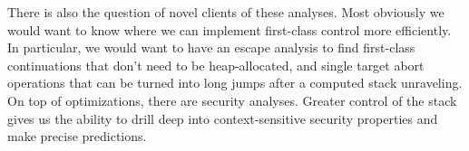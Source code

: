There is also the question of novel clients of these analyses.
%
Most obviously we would want to know where we can implement first-class control more efficiently.
%
In particular, we would want to have an escape analysis to find first-class continuations that don't need to be heap-allocated, and single target abort operations that can be turned into long jumps after a computed stack unraveling.
%
On top of optimizations, there are security analyses.
%
Greater control of the stack gives us the ability to drill deep into context-sensitive security properties and make precise predictions.
